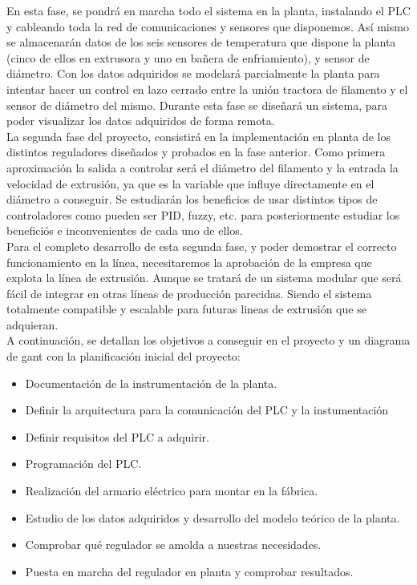 En esta fase, se pondrá en marcha todo el sistema en la planta, instalando el PLC y cableando toda la red de comunicaciones y sensores que disponemos. Así mismo se almacenarán datos de los seis sensores de temperatura que dispone la planta (cinco de ellos en extrusora y uno en bañera de enfriamiento), y sensor de diámetro. Con los datos adquiridos se modelará parcialmente la planta para intentar hacer un control en lazo cerrado entre la unión tractora de filamento y el sensor de diámetro del mismo. Durante esta fase se diseñará un sistema, para poder visualizar los datos adquiridos de forma remota.\\

La segunda fase del proyecto, consistirá en la implementación en planta de los distintos reguladores diseñados y probados en la fase anterior. Como primera aproximación la salida a controlar será el diámetro del filamento y la entrada la velocidad de extrusión, ya que es la variable que influye directamente en el diámetro a conseguir. Se estudiarán los beneficios de usar distintos tipos de controladores como pueden ser PID, fuzzy, etc. para posteriormente estudiar los beneficiós e inconvenientes de cada uno de ellos.\\

Para el completo desarrollo de esta segunda fase, y poder demostrar el correcto funcionamiento en la línea, necesitaremos la aprobación de la empresa que explota la línea de extrusión. Aunque se tratará de un sistema modular que será fácil de integrar en otras líneas de producción parecidas. Siendo el sistema totalmente compatible y escalable para futuras lineas de extrusión que se adquieran.\\

A continuación, se detallan los objetivos a conseguir en el proyecto y un diagrama de gant con la planificación inicial del proyecto:

\begin{itemize}
	\item Documentación de la instrumentación de la planta.
	\item Definir la arquitectura para la comunicación del PLC y la instumentación
	\item Definir requisitos del PLC a adquirir.
	\item Programación del PLC.
	\item Realización del armario eléctrico para montar en la fábrica.
	\item Estudio de los datos adquiridos y desarrollo del modelo teórico de la planta.
	\item Comprobar qué regulador se amolda a nuestras necesidades.
	\item Puesta en marcha del regulador en planta y comprobar resultados.
\end{itemize}
\label{Listado_objetivos}
